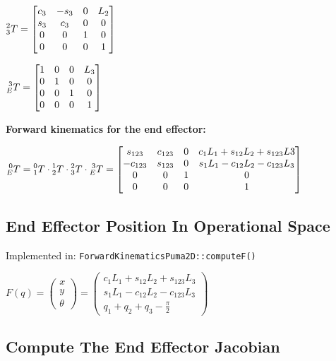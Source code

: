 \documentclass[a4paper,10pt]{article}
\begin{document}
$\prescript{2}{3}{T}=
\begin{bmatrix} 
c_3 & -s_3 & 0 & L_2 \\
s_3 & c_3 & 0 & 0 \\
0 & 0 & 1 & 0 \\
0 & 0 & 0 & 1
\end{bmatrix}
$

$\prescript{3}{E}{T}=
\begin{bmatrix} 
1 & 0 & 0 & L_3 \\
0 & 1 & 0 & 0 \\
0 & 0 & 1 & 0 \\
0 & 0 & 0 & 1
\end{bmatrix}
$

\textbf{Forward kinematics for the end effector:}

$
\prescript{0}{E}{T}=\prescript{0}{1}{T} \cdot \prescript{1}{2}{T} \cdot \prescript{2}{3}{T} \cdot \prescript{3}{E}{T}=
\begin{bmatrix} 
s_{123} & c_{123} & 0 & c_1L_1 + s_{12}L_2 + s_{123}L3 \\
-c_{123} & s_{123} & 0 & s_1L_1 - c_{12}L_2 - c_{123}L_3 \\
0 & 0 & 1 & 0 \\
0 & 0 & 0 & 1
\end{bmatrix}
$


\subsection{End Effector Position In Operational Space}

\vspace{-6mm}Implemented in: \texttt{ForwardKinematicsPuma2D::computeF()}

$
F(q)= \begin{pmatrix}x\\y\\\theta\end{pmatrix}=
\begin{pmatrix}
c_1L_1+s_{12}L_2+s_{123}L_3 \\
s_1L_1 - c_{12}L_2 - c_{123}L_3\\
q_1+q_2+q_3- \frac{\pi}{2}
\end{pmatrix}
$


\subsection{Compute The End Effector Jacobian}
\end{document}

